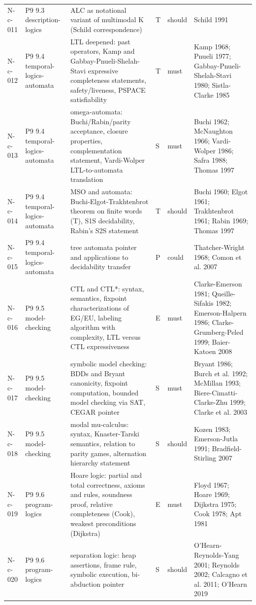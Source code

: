 \begin{longtable}{@{}p{0.52in}p{0.85in}p{2.5in}p{0.22in}p{0.42in}p{1.95in}@{}}
N-c-011 & P9 9.3 description-logics & ALC as notational variant of multimodal K (Schild correspondence) & T & should & Schild 1991 \\
N-c-012 & P9 9.4 temporal-logics-automata & LTL deepened: past operators, Kamp and Gabbay-Pnueli-Shelah-Stavi expressive completeness statements, safety/liveness, PSPACE satisfiability & T & must & Kamp 1968; Pnueli 1977; Gabbay-Pnueli-Shelah-Stavi 1980; Sistla-Clarke 1985 \\
N-c-013 & P9 9.4 temporal-logics-automata & omega-automata: Buchi/Rabin/parity acceptance, closure properties, complementation statement, Vardi-Wolper LTL-to-automata translation & S & must & Buchi 1962; McNaughton 1966; Vardi-Wolper 1986; Safra 1988; Thomas 1997 \\
N-c-014 & P9 9.4 temporal-logics-automata & MSO and automata: Buchi-Elgot-Trakhtenbrot theorem on finite words (T), S1S decidability, Rabin's S2S statement & T & should & Buchi 1960; Elgot 1961; Trakhtenbrot 1961; Rabin 1969; Thomas 1997 \\
N-c-015 & P9 9.4 temporal-logics-automata & tree automata pointer and applications to decidability transfer & P & could & Thatcher-Wright 1968; Comon et al. 2007 \\
N-c-016 & P9 9.5 model-checking & CTL and CTL*: syntax, semantics, fixpoint characterizations of EG/EU, labeling algorithm with complexity, LTL versus CTL expressiveness & E & must & Clarke-Emerson 1981; Queille-Sifakis 1982; Emerson-Halpern 1986; Clarke-Grumberg-Peled 1999; Baier-Katoen 2008 \\
N-c-017 & P9 9.5 model-checking & symbolic model checking: BDDs and Bryant canonicity, fixpoint computation, bounded model checking via SAT, CEGAR pointer & S & must & Bryant 1986; Burch et al. 1992; McMillan 1993; Biere-Cimatti-Clarke-Zhu 1999; Clarke et al. 2003 \\
N-c-018 & P9 9.5 model-checking & modal mu-calculus: syntax, Knaster-Tarski semantics, relation to parity games, alternation hierarchy statement & S & should & Kozen 1983; Emerson-Jutla 1991; Bradfield-Stirling 2007 \\
N-c-019 & P9 9.6 program-logics & Hoare logic: partial and total correctness, axioms and rules, soundness proof, relative completeness (Cook), weakest preconditions (Dijkstra) & E & must & Floyd 1967; Hoare 1969; Dijkstra 1975; Cook 1978; Apt 1981 \\
N-c-020 & P9 9.6 program-logics & separation logic: heap assertions, frame rule, symbolic execution, bi-abduction pointer & S & should & O'Hearn-Reynolds-Yang 2001; Reynolds 2002; Calcagno et al. 2011; O'Hearn 2019 \\

\end{longtable}

